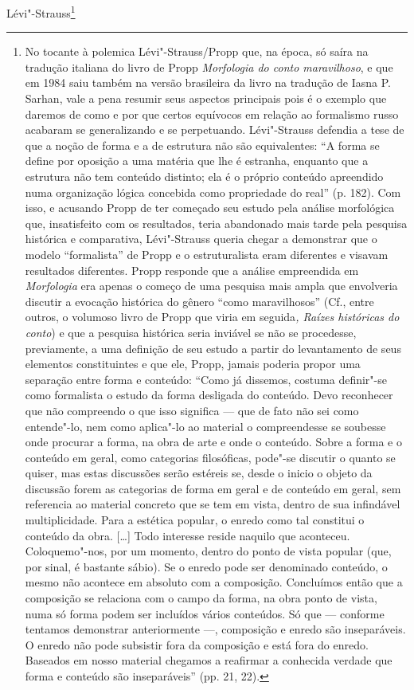 Lévi"-Strauss\footnote{No tocante à polemica Lévi"-Strauss/Propp que, na
  época, só saíra na tradução italiana do livro de Propp
  \emph{Morfologia do conto maravilhoso}, e que em 1984 saiu também na
  versão brasileira da livro na tradução de Iasna P. Sarhan, vale a pena
  resumir seus aspectos principais pois é o exemplo que daremos de como
  e por que certos equívocos em relação ao formalismo russo acabaram se
  generalizando e se perpetuando. Lévi"-Strauss defendia a tese de que a
  noção de forma e a de estrutura não são equivalentes: ``A forma se
  define por oposição a uma matéria que lhe é estranha, enquanto que a
  estrutura não tem conteúdo distinto; ela é o próprio conteúdo
  apreendido numa organização lógica concebida como propriedade do
  real'' (p. 182). Com isso, e acusando Propp de ter começado seu estudo
  pela análise morfológica que, insatisfeito com os resultados, teria
  abandonado mais tarde pela pesquisa histórica e comparativa,
  Lévi"-Strauss queria chegar a demonstrar que o modelo ``formalista'' de
  Propp e o estruturalista eram diferentes e visavam resultados
  diferentes. Propp responde que a análise empreendida em
  \emph{Morfologia} era apenas o começo de uma pesquisa mais ampla que
  envolveria discutir a evocação histórica do gênero ``como
  maravilhosos'' (Cf., entre outros, o volumoso livro de Propp que viria
  em seguida\emph{, Raízes históricas do conto}) e que a pesquisa
  histórica seria inviável se não se procedesse, previamente, a uma
  definição de seu estudo a partir do levantamento de seus elementos
  constituintes e que ele, Propp, jamais poderia propor uma separação
  entre forma e conteúdo: ``Como já dissemos, costuma definir"-se como
  formalista o estudo da forma desligada do conteúdo. Devo reconhecer
  que não compreendo o que isso significa --- que de fato não sei como
  entende"-lo, nem como aplica"-lo ao material o compreendesse se soubesse
  onde procurar a forma, na obra de arte e onde o conteúdo. Sobre a
  forma e o conteúdo em geral, como categorias filosóficas, pode"-se
  discutir o quanto se quiser, mas estas discussões serão estéreis se,
  desde o inicio o objeto da discussão forem as categorias de forma em
  geral e de conteúdo em geral, sem referencia ao material concreto que
  se tem em vista, dentro de sua infindável multiplicidade. Para a
  estética popular, o enredo como tal constitui o conteúdo da obra.
  {[}\ldots{}{]} Todo interesse reside naquilo que aconteceu. Coloquemo"-nos,
  por um momento, dentro do ponto de vista popular (que, por sinal, é
  bastante sábio). Se o enredo pode ser denominado conteúdo, o mesmo não
  acontece em absoluto com a composição. Concluímos então que a
  composição se relaciona com o campo da forma, na obra ponto de vista,
  numa só forma podem ser incluídos vários conteúdos. Só que --- conforme
  tentamos demonstrar anteriormente ---, composição e enredo são
  inseparáveis. O enredo não pode subsistir fora da composição e está
  fora do enredo. Baseados em nosso material chegamos a reafirmar a
  conhecida verdade que forma e conteúdo são inseparáveis'' (pp. 21,
  22).

}

